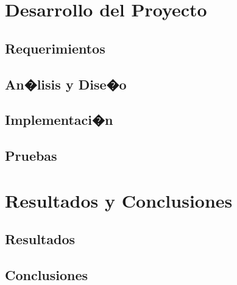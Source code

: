 \documentclass[12pt,letterpaper,spanish, xcolor=table]{report}
\begin{document}
\chapter{Desarrollo del Proyecto}
\newpage

\section{Requerimientos}

\section{An�lisis y Dise�o}

\section{Implementaci�n}

\section{Pruebas}



\chapter{Resultados y Conclusiones}
\newpage

\section{Resultados}


\section{Conclusiones}



\newpage

\appendix

%

\end{document}
